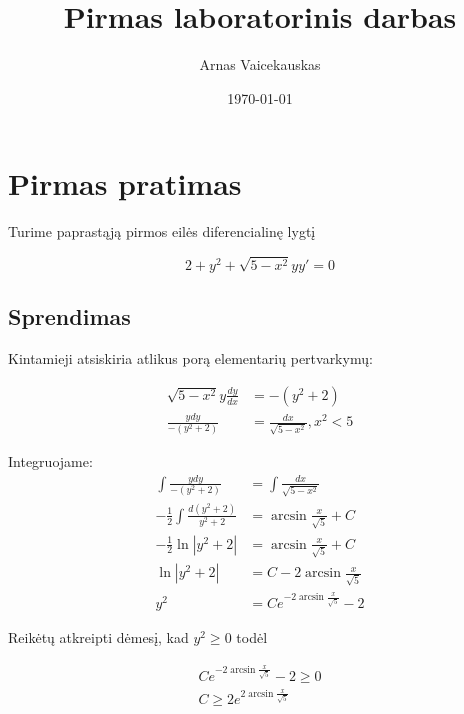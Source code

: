 \documentclass[11pt]{article}
\title{ Pirmas laboratorinis darbas}
\author{ Arnas Vaicekauskas }
\date{\today}
\begin{document}
\maketitle

\section{Pirmas pratimas}

Turime paprastąją pirmos eilės diferencialinę lygtį

$$
2+y^2+\sqrt{5-x^2}yy'=0
$$


\subsection{Sprendimas}

Kintamieji atsiskiria atlikus porą elementarių pertvarkymų:

\begin{equation}
\begin{split}
\sqrt{5-x^2}y\frac{dy}{dx}&=-(y^2+2) \\
\frac{ydy}{-(y^2+2)}&=\frac{dx}{\sqrt{5-x^2}}, x^2 < 5
\end{split}
\end{equation}

Integruojame:
\begin{equation}
    \begin{split}
        \int\frac{ydy}{-(y^2+2)}&=\int\frac{dx}{\sqrt{5-x^2}} \\
        -\frac{1}{2}\int\frac{d(y^2+2)}{y^2+2}&=\arcsin{\frac{x}{\sqrt{5}}}+C\\
        -\frac{1}{2}\ln|y^2+2|&=\arcsin{\frac{x}{\sqrt{5}}}+C\\
        \ln|y^2+2|&=C-2\arcsin{\frac{x}{\sqrt{5}}}\\
        y^2&=Ce^{-2\arcsin{\frac{x}{\sqrt{5}}}} - 2
    \end{split}
\end{equation}


Reikėtų atkreipti dėmesį, kad $y^2\geqslant 0$ todėl

\begin{equation}
    \begin{split}
        Ce^{-2\arcsin{\frac{x}{\sqrt{5}}}} - 2 \geqslant 0\\
C \geqslant 2 e^{2\arcsin{\frac{x}{\sqrt{5}}}}
    \end{split}
\end{equation}
\end{document}
